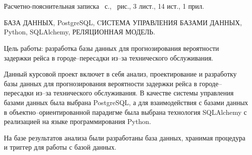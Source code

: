 \chapter*{}

Расчетно-пояснительная записка~\pageref{LastPage} с., \totalfigures\ рис., 3 лист., 14 ист., 1 прил.

БАЗА ДАННЫХ, PostgreSQL, CИСТЕМА УПРАВЛЕНИЯ БАЗАМИ ДАННЫХ, Python, SQLAlchemy, РЕЛЯЦИОННАЯ МОДЕЛЬ.

Цель работы: разработка базы данных для прогнозирования вероятности задержки рейса в городе--пересадки из--за технического обслуживания.

Данный курсовой проект включет в себя анализ, проектирование и разработку
базы данных для прогнозирования вероятности задержки рейса в городе--пересадки из--за технического обслуживания.
В качестве системы управления базами данных была выбрана PostgreSQL, а для взаимодействия с базами данных в объектно--ориентированной парадигме была выбрана технология SQLAlchemy с реализацией на языке программирования Python.

На базе результатов анализа были разработаны база данных, хранимая процедура и триггер для работы с базой данных.